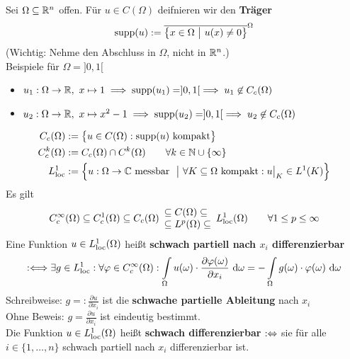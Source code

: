 \begin{beispiel}\enter
	Sei $\Omega\subseteq\mathbb{R}^n$ offen. Für $u\in C(\Omega)$ deifnieren wir den \textbf{Träger}
	\begin{align*}
		\operatorname{supp}(u):=\overline{\big\lbrace x\in\Omega~\big|~u(x)\neq0\big\rbrace}^\Omega
	\end{align*}
	(Wichtig: Nehme den Abschluss in $\Omega$, nicht in $\mathbb{R}^n$.)\\
	Beispiele für $\Omega=]0,1[$
	\begin{itemize}
		\item $u_1:\Omega\to\mathbb{R},~x\mapsto 1\implies\operatorname{supp}(u_1)=]0,1[\implies u_1\not\in C_c(\Omega)$
		\item $u_2:\Omega\to\mathbb{R},~x\mapsto x^2-1\implies\operatorname{supp}(u_2)=]0,1[\implies u_2\not\in C_c(\Omega)$
	\end{itemize}
	\begin{align*}
		C_c(\Omega)&:=\big\lbrace u\in C(\Omega):\operatorname{supp}(u)\text{ kompakt}\big\rbrace\\
		C_c^k(\Omega)&:=C_c(\Omega)\cap C^k(\Omega)\qquad\forall k\in\mathbb{N}\cup\lbrace\infty\rbrace\\
		L^1_{\text{loc}}&:=\Big\lbrace u:\Omega\to\mathbb{C}\text{ messbar }~\big|~\forall K\subseteq\Omega\text{ kompakt}:u\big|_K\in L^1(K)\Big\rbrace
	\end{align*}
	Es gilt
	\begin{align*}
		C_c^\infty(\Omega)\subseteq C^1_c(\Omega)\subseteq C_c(\Omega)\begin{array}{l}
			\subseteq C(\Omega)\subseteq\\
			\subseteq L^p(\Omega)\subseteq
		\end{array} L^1_{\text{loc}}(\Omega)\qquad\forall 1\leq p\leq\infty
	\end{align*}
	Eine Funktion $u\in L^1_{\text{loc}}(\Omega)$ heißt \textbf{schwach partiell nach $x_i$ differenzierbar}
	\begin{align*}
		:\Longleftrightarrow\exists g\in L^1_{\text{loc}}:\forall\varphi\in C^\infty_c(\Omega):\int\limits_\Omega u(\omega)\cdot\frac{\partial\varphi(\omega)}{\partial x_i}\text{ d}\omega=-\int\limits_\Omega g(\omega)\cdot\varphi(\omega)\text{ d}\omega
	\end{align*}
	Schreibweise: $g=:\frac{\partial u}{\partial x_i}$ ist die \textbf{schwache partielle Ableitung} nach $x_i$\\
	Ohne Beweis: $g=\frac{\partial u}{\partial x_i}$ ist eindeutig bestimmt.\\
	Die Funktion $u\in L^1_{\text{loc}}(\Omega)$ heißt \textbf{schwach differenzierbar} $:\Leftrightarrow$ sie für alle $i\in\lbrace1,\ldots,n\rbrace$ schwach partiell nach $x_i$ differenzierbar ist. 

\end{beispiel}
